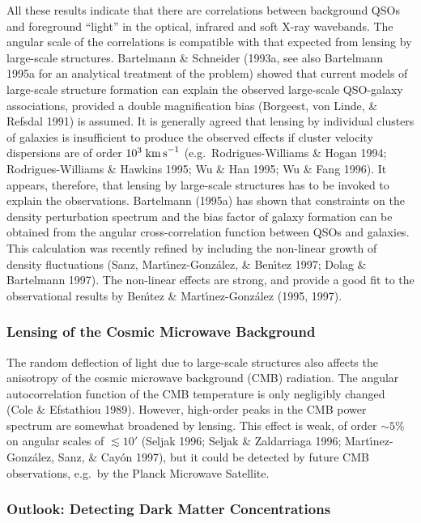 \documentclass[a4paper,10pt]{article} %
\newcommand{\la}{\lesssim}
\begin{document}
All these results indicate that there are correlations between
background QSOs and foreground ``light'' in the optical, infrared and
soft X-ray wavebands. The angular scale of the correlations is
compatible with that expected from lensing by large-scale structures.
Bartelmann \& Schneider (1993a, see also Bartelmann 1995a for an
analytical treatment of the problem) showed that current models of
large-scale structure formation can explain the observed large-scale
QSO-galaxy associations, provided a double magnification bias
(Borgeest, von Linde, \& Refsdal 1991) is assumed. It is generally
agreed that lensing by individual clusters of galaxies is insufficient
to produce the observed effects if cluster velocity dispersions are of
order $10^3\;{\rm km\,s}^{-1}$ (e.g.\ Rodrigues-Williams \& Hogan
1994; Rodrigues-Williams \& Hawkins 1995; Wu \& Han 1995; Wu \& Fang
1996). It appears, therefore, that lensing by large-scale structures
has to be invoked to explain the observations. Bartelmann (1995a) has
shown that constraints on the density perturbation spectrum and the
bias factor of galaxy formation can be obtained from the angular
cross-correlation function between QSOs and galaxies. This calculation
was recently refined by including the non-linear growth of density
fluctuations (Sanz, Mart{\'\i}nez-Gonz\'alez, \& Ben{\'\i}tez 1997;
Dolag \& Bartelmann 1997). The non-linear effects are strong, and
provide a good fit to the observational results by Ben{\'\i}tez \&
Mart{\'\i}nez-Gonz\'alez (1995, 1997).

\subsubsection{Lensing of the Cosmic Microwave Background}
\label{NB:subsubsect4.3.3}

The random deflection of light due to large-scale structures also
affects the anisotropy of the cosmic microwave background (CMB)
radiation. The angular autocorrelation function of the CMB temperature
is only negligibly changed (Cole \& Efstathiou 1989). However,
high-order peaks in the CMB power spectrum are somewhat broadened by
lensing. This effect is weak, of order $\sim5\%$ on angular scales of
$\la10'$ (Seljak 1996; Seljak \& Zaldarriaga 1996;
Mart{\'\i}nez-Gonz\'alez, Sanz, \& Cay\'on 1997), but it could be
detected by future CMB observations, e.g.\ by the Planck Microwave
Satellite.

\subsubsection{Outlook: Detecting Dark Matter Concentrations}
\label{NB:subsubsect4.3.4}
\end{document}
